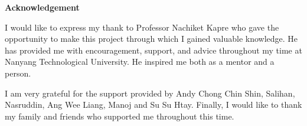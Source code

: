
\thispagestyle{plain}
\begin{center}
    \textbf{Acknowledgement}
\end{center}
 
I would like to express my thank to Professor Nachiket Kapre who gave the opportunity to make this project through which I gained valuable knowledge. He has provided me with encouragement, support, and advice throughout my time at Nanyang Technological University. He inspired me both as a mentor and a person.

I am very grateful for the support provided by Andy Chong Chin Shin, Salihan, Nasruddin, Ang Wee Liang, Manoj and Su Su Htay. Finally, I would like to thank my family and friends who supported me throughout this time.